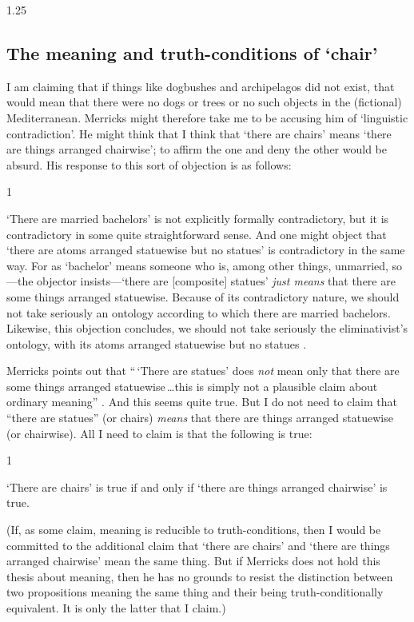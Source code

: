 \documentclass[11pt]{article}
\newenvironment{squote}{%
\begin{spacing}{1}
       	\begin{list}{}{%
\setlength{\labelwidth}{0pt}%
\rightmargin\leftmargin%
}
\item\relax
}{%
\end{list}%
\end{spacing}
}
\begin{document}
\begin{spacing}{1.25}
\subsection{The meaning and truth-conditions of `chair'}
\label{meaning}
I am claiming that if things like dogbushes and archipelagos did not
exist, that would mean that there were no dogs or trees or no such
objects in the (fictional) Mediterranean.  Merricks might therefore
take me to be accusing him of `linguistic contradiction'.  He might
think that I think that `there are chairs' means `there are things
arranged chairwise'; to affirm the one and deny the other would be
absurd.  His response to this sort of objection is as follows:

\begin{squote}
`There are married bachelors' is not explicitly formally
  contradictory, but it is contradictory in some quite straightforward
  sense.  And one might object that `there are atoms arranged
  statuewise but no statues' is contradictory in the same way.  For as
  `bachelor' means someone who is, among other things, unmarried,
  so---the objector insists---`there are [composite] statues' {\em
    just means} that there are some things arranged statuewise.
  Because of its contradictory nature, we should not take seriously an
  ontology according to which there are married bachelors.  Likewise,
  this objection concludes, we should not take seriously the
  eliminativist's ontology, with its atoms arranged statuewise but no
  statues \citeyearpar[13]{merricks2001a}.
\end{squote}

Merricks points out that ``\,`There are statues' does {\em not} mean
only that there are some things arranged statuewise\,\ldots this is
simply not a plausible claim about ordinary meaning''
\citeyearpar[13]{merricks2001a}.  And this seems quite true.  But I do
not need to claim that ``there are statues'' (or chairs) {\em means}
that there are things arranged statuewise (or chairwise).  All I need
to claim is that the following is true:

\begin{squote}
`There are chairs' is true if and only if `there are things arranged
  chairwise' is true.
\end{squote}

(If, as some claim, meaning is reducible to truth-conditions, then I
would be committed to the additional claim that `there are chairs' and
`there are things arranged chairwise' mean the same thing.  But if
Merricks does not hold this thesis about meaning, then he has no
grounds to resist the distinction between two propositions meaning the
same thing and their being truth-conditionally equivalent.  It is only
the latter that I claim.)


\end{spacing}
\end{document}
